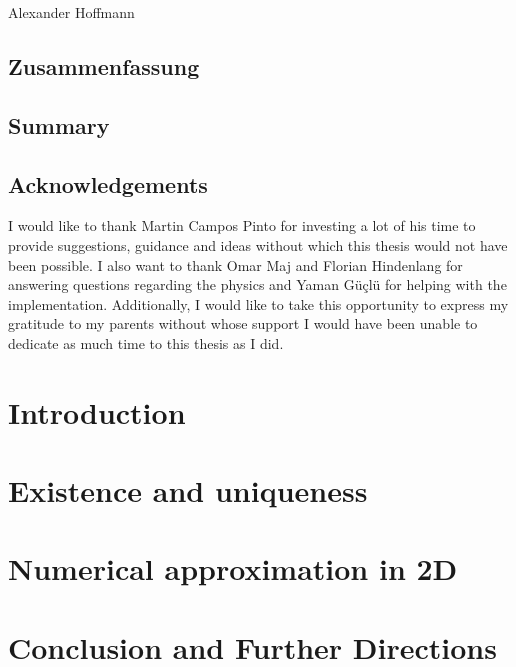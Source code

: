 \documentclass[12pt,a4paper,times]{report}
\numberwithin{equation}{section}
\numberwithin{figure}{section}
\numberwithin{lemma}{section}
\theoremstyle{definition}
\begin{document}
\noindent\hspace{1cm} Alexander Hoffmann
    \vspace{1cm}
\newpage
\thispagestyle{empty}
\section*{Zusammenfassung}

\vspace{1cm}
\section*{Summary}

\newpage

\thispagestyle{empty}
\section*{Acknowledgements}
I would like to thank Martin Campos Pinto for investing a lot of his time 
to provide suggestions, guidance and ideas without which this thesis would not have 
been possible. I also want to thank Omar Maj and Florian Hindenlang for answering questions regarding the physics 
and Yaman Güçlü for helping with the implementation. Additionally, I would like to take 
this opportunity to express my gratitude to my parents without whose support I would have 
been unable to dedicate as much time to this thesis as I did.
\newpage

\tableofcontents
\newpage
{}
\setcounter{page}{1}

\chapter{Introduction}\label{chap:introduction}

\chapter{Existence and uniqueness}\label{chap:existence_and_uniqueness}

\chapter{Numerical approximation in 2D}\label{chap:approximation_in_2D}

\chapter{Conclusion and Further Directions}\label{chap:conclusion}

\printbibliography
\end{document}
